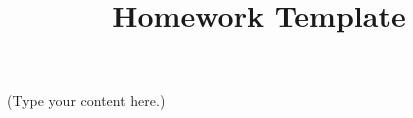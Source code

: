 \documentclass{article}
\title{Homework Template}
\begin{document}
(Type your content here.)
\end{document}
